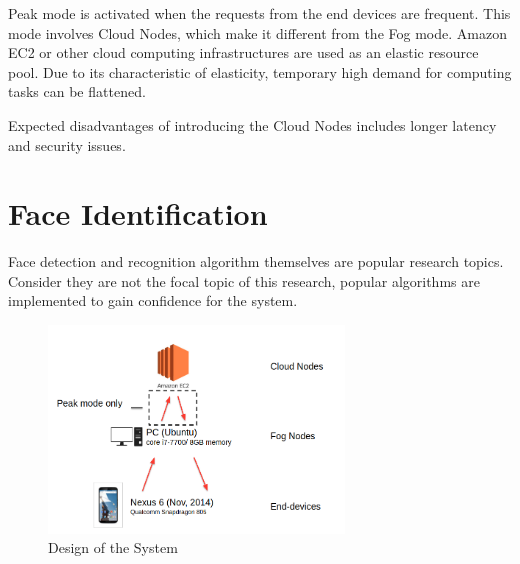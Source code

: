 Peak mode is activated when the requests from the end devices are frequent. This mode involves Cloud Nodes, which make it different from the Fog mode. Amazon EC2 or other cloud computing infrastructures are used as an elastic resource pool. Due to its characteristic of elasticity, temporary high demand for computing tasks can be flattened.

Expected disadvantages of introducing the Cloud Nodes includes longer latency and security issues.

\section{Face Identification}
Face detection and recognition algorithm themselves are popular research topics. Consider they are not the focal topic of this research, popular algorithms are implemented to gain confidence for the system.

\begin{figure}
    \centering
    \includegraphics[width=0.7\textwidth]{images/design-of-the-system.png}
    \caption{Design of the System}
    \label{fig:design_of_the_system}
\end{figure}

